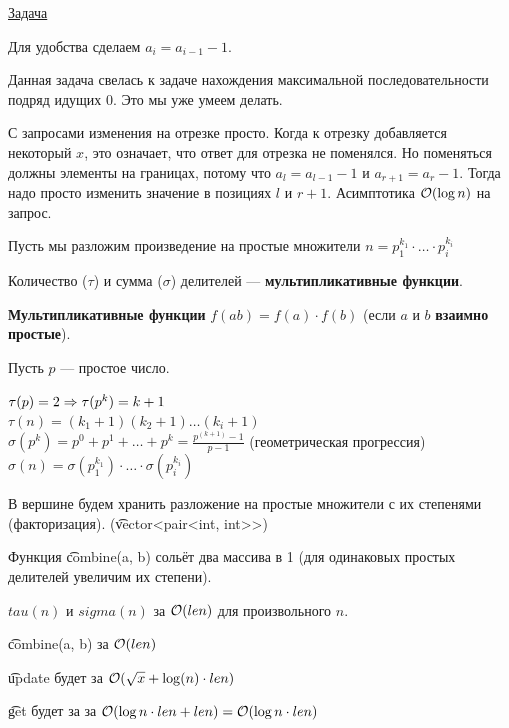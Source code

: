  
 \href{https://informatics.mccme.ru/mod/statements/view.php?chapterid=113632}{Задача}

Для удобства сделаем $a_i = a_{i - 1} - 1$.

Данная задача свелась к задаче нахождения максимальной последовательности подряд идущих $0$. Это мы уже умеем делать.

С запросами изменения на отрезке просто. Когда к отрезку добавляется некоторый $x$, это означает, что ответ для отрезка не поменялся. Но поменяться должны элементы на границах, потому что $a_l = a_{l - 1} - 1$ и $a_{r + 1} = a_r - 1$. Тогда надо просто изменить значение в позициях $l$ и $r + 1$. Асимптотика $\mathcal{O}(\log n)$ на запрос.



Пусть мы разложим произведение на простые множители $n = p_1^{k_1} \cdot \ldots \cdot p_i^{k_i}$

Количество ($\tau$) и сумма ($\sigma$) делителей --- {\bf мультипликативные функции}.

{\bf Мультипликативные функции} $f(ab) = f(a) \cdot f(b)$ (если $a$ и $b$ {\bf взаимно простые}). 

Пусть $p$ --- простое число.

$\tau(p) = 2 \Rightarrow \tau(p^k) = k + 1$ \\
$\tau(n) = (k_1+1) (k_2+1) \ldots (k_i+1)$ \\
$\sigma(p ^ k) = p^0 + p^1 + \ldots + p^k = \frac{p^(k + 1) - 1}{p - 1}$ (геометрическая прогрессия) \\
$\sigma(n) = \sigma(p_1^{k_1}) \cdot \ldots \cdot \sigma(p_i^{k_i})$

\down

В вершине будем хранить разложение на простые множители с их степенями (факторизация). (\t{vector<pair<int, int>>})

Функция \t{combine(a, b)} сольёт два массива в 1 (для одинаковых простых делителей увеличим их степени).


$tau(n)$ и $sigma(n)$ за $\mathcal{O}(len)$ для произвольного $n$.

\t{combine(a, b)} за $\mathcal{O}(len)$

\t{update} будет за $\mathcal{O}(\sqrt x + \log(n) \cdot len)$ 

\t{get} будет за за $\mathcal{O}(\log n \cdot len + len) = \mathcal{O}(\log n \cdot len)$



